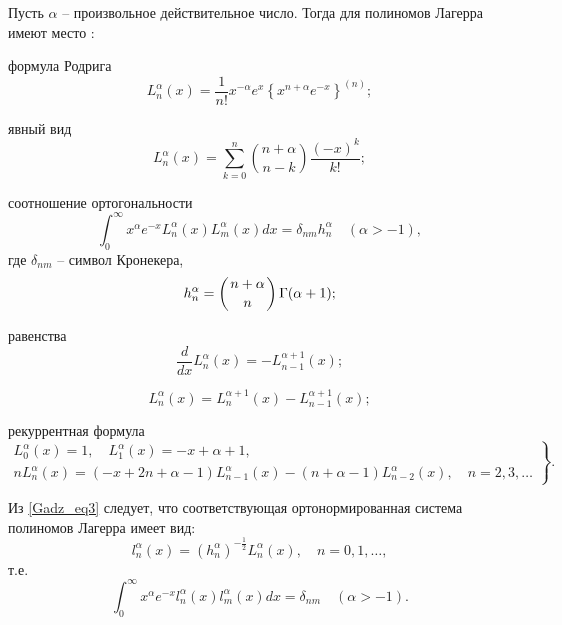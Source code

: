 Пусть $\alpha$ -- произвольное действительное число. Тогда для полиномов Лагерра имеют место \cite{Gadz3}:

формула Родрига
\begin{equation*}
L_n^{\alpha}(x) = \frac{1}{n!}x^{-\alpha}e^{x} \left\{ x^{n+\alpha} e^{-x} \right\}^{(n)};
\end{equation*}

явный вид
\begin{equation}\label{Gadz_eq2}
L_n^\alpha(x) =\sum\limits_{k=0}^{n}\binom{n+\alpha}{n-k}\frac{(-x)^k}{k!};
\end{equation}

соотношение ортогональности
\begin{equation}\label{Gadz_eq3}
\int_0^{\infty} x^{\alpha} e^{-x} L^{\alpha}_{n}(x) L^{\alpha}_{m}(x) dx = \delta_{nm} h^{\alpha}_n \quad (\alpha > -1),
\end{equation}
где $\delta_{nm}$ -- символ Кронекера,
\begin{equation*}
h^{\alpha}_n = \left( n+\alpha \atop n \right) \Gamma(\alpha +1);
\end{equation*}

равенства
\begin{equation}\label{Gadz_eqRav}
\frac{d}{dx} L_n^{\alpha}(x) = -L_{n-1}^{\alpha+1}(x);
\end{equation}

\begin{equation}\label{Gadz_eqRav1}
L_{n}^{\alpha}(x) =L_{n}^{\alpha+1}(x) -L_{n-1}^{\alpha+1}(x);
\end{equation}

рекуррентная формула
\begin{equation}\label{Gadz_eq4}
\left.\begin{gathered}
L_{0}^{\alpha}(x)=1, \quad L_1^{\alpha}(x)=-x+\alpha+1,\\
nL_n^{\alpha}(x)=(-x+2n+\alpha-1)L_{n-1}^{\alpha}(x)-(n+\alpha-1)L_{n-2}^{\alpha}(x), \quad n=2, 3, \ldots
\end{gathered}\right\}.
\end{equation}

Из \eqref{Gadz_eq3} следует, что соответствующая ортонормированная система полиномов Лагерра имеет вид:
\begin{equation}\label{Gadz_eq5}
l_n^{\alpha}(x)=(h^{\alpha}_n)^{-\frac{1}{2}}L_n^{\alpha}(x), \quad n=0, 1, \ldots,
\end{equation}
т.е.
\begin{equation*}
\int_0^{\infty} x^{\alpha} e^{-x} l^{\alpha}_{n}(x) l^{\alpha}_{m}(x) dx = \delta_{nm} \quad (\alpha > -1).
\end{equation*}


